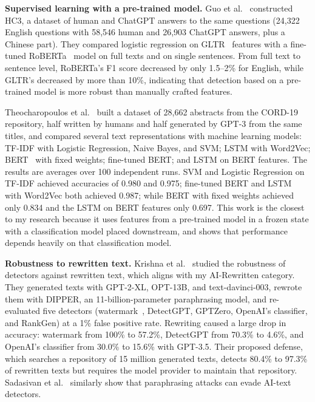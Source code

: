 \documentclass[conference,a4paper]{IEEEtran}
\begin{document}
\textbf{Supervised learning with a pre-trained model.} Guo et al.~\cite{guo2023hc3} constructed HC3, a dataset of human and ChatGPT answers to the same questions (24,322 English questions with 58,546 human and 26,903 ChatGPT answers, plus a Chinese part). They compared logistic regression on GLTR~\cite{gehrmann2019gltr} features with a fine-tuned RoBERTa~\cite{liu2019roberta} model on full texts and on single sentences. From full text to sentence level, RoBERTa's F1 score decreased by only 1.5--2\% for English, while GLTR's decreased by more than 10\%, indicating that detection based on a pre-trained model is more robust than manually crafted features.

Theocharopoulos et al.~\cite{theocharopoulos} built a dataset of 28,662 abstracts from the CORD-19 repository, half written by humans and half generated by GPT-3 from the same titles, and compared several text representations with machine learning models: TF-IDF with Logistic Regression, Naive Bayes, and SVM; LSTM with Word2Vec; BERT~\cite{bert} with fixed weights; fine-tuned BERT; and LSTM on BERT features. The results are averages over 100 independent runs. SVM and Logistic Regression on TF-IDF achieved accuracies of 0.980 and 0.975; fine-tuned BERT and LSTM with Word2Vec both achieved 0.987; while BERT with fixed weights achieved only 0.834 and the LSTM on BERT features only 0.697. This work is the closest to my research because it uses features from a pre-trained model in a frozen state with a classification model placed downstream, and shows that performance depends heavily on that classification model.

\textbf{Robustness to rewritten text.} Krishna et al.~\cite{krishna2023dipper} studied the robustness of detectors against rewritten text, which aligns with my AI-Rewritten category. They generated texts with GPT-2-XL, OPT-13B, and text-davinci-003, rewrote them with DIPPER, an 11-billion-parameter paraphrasing model, and re-evaluated five detectors (watermark~\cite{kirchenbauer2023watermark}, DetectGPT, GPTZero, OpenAI's classifier, and RankGen) at a 1\% false positive rate. Rewriting caused a large drop in accuracy: watermark from 100\% to 57.2\%, DetectGPT from 70.3\% to 4.6\%, and OpenAI's classifier from 30.0\% to 15.6\% with GPT-3.5. Their proposed defense, which searches a repository of 15 million generated texts, detects 80.4\% to 97.3\% of rewritten texts but requires the model provider to maintain that repository. Sadasivan et al.~\cite{sadasivan2023reliable} similarly show that paraphrasing attacks can evade AI-text detectors.
\end{document}
